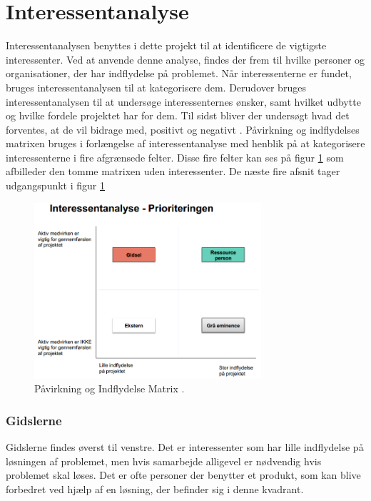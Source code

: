 \section{Interessentanalyse}
Interessentanalysen benyttes i dette projekt til at identificere de vigtigste interessenter. Ved at anvende denne analyse, findes der frem til hvilke personer og organisationer, der har indflydelse på problemet. Når interessenterne er fundet, bruges interessentanalysen til at kategorisere dem. Derudover bruges interessentanalysen til at undersøge interessenternes ønsker, samt hvilket udbytte og hvilke fordele projektet har for dem. Til sidst bliver der undersøgt hvad det forventes, at de vil bidrage med, positivt og negativt \citep{MetteLindegaardAttrup2008}.
Påvirkning og indflydelses matrixen bruges i forlængelse af interessentanalyse med henblik på at kategorisere interessenterne i fire afgrænsede felter. Disse fire felter kan ses på figur \ref{fig:PavirkInflydMat} som afbilleder den tomme matrixen uden interessenter. De næste fire afsnit tager udgangspunkt i figur \ref{fig:PavirkInflydMat}

\begin{figure}[H]
    \centering
    \includegraphics[width=0.75\textwidth]{figures/Udklip.PNG}
    \caption{Påvirkning og Indflydelse Matrix \citep{Holgaard2014}.} 
    \label{fig:PavirkInflydMat}
\end{figure}

\subsubsection{Gidslerne}
Gidslerne findes øverst til venstre. Det er interessenter som har lille indflydelse på løsningen af problemet, men hvis samarbejde alligevel er nødvendig hvis problemet skal løses. Det er ofte personer der benytter et produkt, som kan blive forbedret ved hjælp af en løsning, der befinder sig i denne kvadrant.

